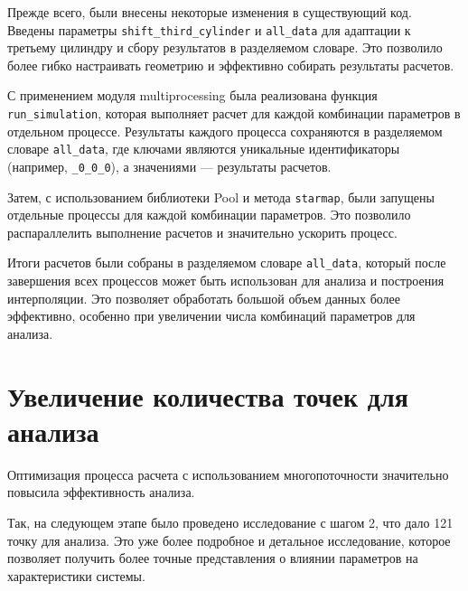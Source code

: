 \documentclass[a4paper,12pt]{article}
\theoremstyle{plain} %
\theoremstyle{definition} %
\theoremstyle{remark} %
\begin{document}
Прежде всего, были внесены некоторые изменения в существующий код. Введены параметры \texttt{shift\_third\_cylinder} и \texttt{all\_data} для адаптации к третьему цилиндру и сбору результатов в разделяемом словаре. Это позволило более гибко настраивать геометрию и эффективно собирать результаты расчетов.

С применением модуля multiprocessing была реализована функция \texttt{run\_simulation}, которая выполняет расчет для каждой комбинации параметров в отдельном процессе. Результаты каждого процесса сохраняются в разделяемом словаре \texttt{all\_data}, где ключами являются уникальные идентификаторы (например, \texttt{\_0\_0\_0}), а значениями — результаты расчетов.

Затем, с использованием библиотеки Pool и метода \texttt{starmap}, были запущены отдельные процессы для каждой комбинации параметров. Это позволило распараллелить выполнение расчетов и значительно ускорить процесс.

Итоги расчетов были собраны в разделяемом словаре \texttt{all\_data}, который после завершения всех процессов может быть использован для анализа и построения интерполяции. Это позволяет обработать большой объем данных более эффективно, особенно при увеличении числа комбинаций параметров для анализа.

\section{Увеличение количества точек для анализа}

Оптимизация процесса расчета с использованием многопоточности значительно повысила эффективность анализа.

Так, на следующем этапе было проведено исследование с шагом 2, что дало 121 точку для анализа. Это уже более подробное и детальное исследование, которое позволяет получить более точные представления о влиянии параметров на характеристики системы.
\end{document}
